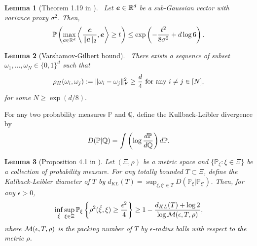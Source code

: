 \documentclass[12pt]{article}
\newtheorem{lem}{Lemma}
\theoremstyle{definition}
\newtheorem{rmk}{Remark}
\begin{document}


\begin{lem}[Theorem 1.19 in \citet{rigollet2015high}]~\label{lem:subga} Let $\bm{e}\in\mathbb{R}^d$ be a sub-Gaussian vector with variance proxy $\sigma^2$. Then, 
\begin{align}
    \mathbb{P}\left(\max_{\bm{c}\in\mathbb{R}^d}\left\langle \frac{\bm{c}}{\|\bm{c}\|_2}, \bm{e}\right\rangle\geq t\right)\leq \exp\left(-\frac{t^2}{8\sigma^2}+d\log 6\right).
\end{align}  
\end{lem}


\begin{lem}[Varshamov-Gilbert bound]~\label{lem:covering} There exists a sequence of subset $\omega_1,\ldots,\omega_N\in\{0,1\}^d$ such that 
\begin{align}
    \rho_H(\omega_i,\omega_j):= \lVert\omega_i-\omega_j\rVert_F^2 \geq \frac{d}{4} \text{ for any } i\neq j\in[N],
\end{align}
for some $N\geq \exp(d/8).$
\end{lem}


For any two probability measures $\mathbb{P}$ and $\mathbb{Q}$, define the Kullback-Leibler divergence by
\[
D(\mathbb{P}|\mathbb{Q})=\int\left(\log {d \mathbb{P} \over d \mathbb{Q}}\right)d\mathbb{P} .
\]

\begin{lem}[Proposition 4.1 in \citet{gao2015rate}]\label{prop:minmax}
Let $(\Xi,\rho)$ be a metric space and $\{\mathbb{P}_\xi\colon\xi\in\Xi\}$ be a collection of probability measure. 
For any totally bounded $T\subset\Xi$, define the Kullback-Leibler diameter of $T$ by $d_{KL}(T) = \sup_{\xi,\xi'\in T}D(\mathbb{P}_{\xi}|\mathbb{P}_{\xi'})$. Then, for any $\epsilon>0$,
\begin{align}
    \inf_{\hat\xi}\sup_{\xi\in\Xi}\mathbb{P}_\xi\left\{\rho^2(\hat\xi,\xi)\geq \frac{\epsilon^2}{4}\right\}\geq 1-\frac{d_{KL}(T)+\log 2}{\log \mathcal{M}(\epsilon,T,\rho)},
\end{align}
where $\mathcal{M}(\epsilon,T,\rho)$ is the packing number of $T$ by $\epsilon$-radius balls with respect to the metric $\rho$.
\end{lem}
\end{document}
